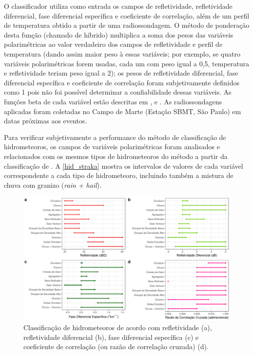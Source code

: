 O classificador utiliza como entrada os campos de refletividade, refletividade diferencial, fase diferencial específica e coeficiente de correlação, além de um perfil de temperatura obtido a partir de uma radiossondagem. O método de ponderação desta função (chamado de híbrido) multiplica a soma dos pesos das variáveis polarimétricas ao valor verdadeiro dos campos de refletividade e perfil de temperatura (dando assim maior peso à essas variáveis; por exemplo, se quatro variáveis polarimétricas forem usadas, cada um com peso igual a 0,5, temperatura e refletividade teriam peso igual a 2); os pesos de refletividade diferencial, fase diferencial específica e coeficiente de correlação foram subjetivamente definidos como 1 pois não foi possível determinar a confiabilidade dessas variáveis. As funções beta de cada variável estão descritas em ,  e . As radiossondagens aplicadas foram coletadas no Campo de Marte (Estação SBMT, São Paulo) em datas próximas aos eventos.

Para verificar subjetivamente a performance do método de classificação de hidrometeoros, os campos de variáveis polarimétricas foram analisados e relacionados com os mesmos tipos de hidrometeoros do método a partir da classificação de . A \autoref{hid_straka} mostra os intervalos de valores de cada variável correspondente a cada tipo de hidrometeoro, incluindo também a mistura de chuva com granizo (\textit{rain + hail}).

\begin{figure}[htb]
	\begin{center}
		\caption{Classificação de hidrometeoros de acordo com refletividade (a), refletividade diferencial (b), fase diferencial específica (c) e coeficiente de correlação (ou razão de correlação cruzada) (d).} 
		\label{hid_straka}
		\includegraphics[width=\columnwidth]{../General_Processing/figures/hids_strakaetal_ptbr.png}
	\end{center}
\end{figure}

